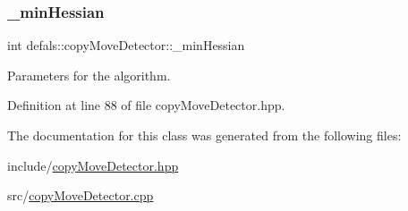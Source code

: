\subsubsection{\texorpdfstring{\+\_\+min\+Hessian}{\_minHessian}}
{\footnotesize\ttfamily int defals\+::copy\+Move\+Detector\+::\+\_\+min\+Hessian\hspace{0.3cm}{\ttfamily [private]}}

Parameters for the algorithm. 

Definition at line 88 of file copy\+Move\+Detector.\+hpp.



The documentation for this class was generated from the following files\+:\begin{DoxyCompactItemize}
\item 
include/\hyperlink{copy_move_detector_8hpp}{copy\+Move\+Detector.\+hpp}\item 
src/\hyperlink{copy_move_detector_8cpp}{copy\+Move\+Detector.\+cpp}\end{DoxyCompactItemize}
